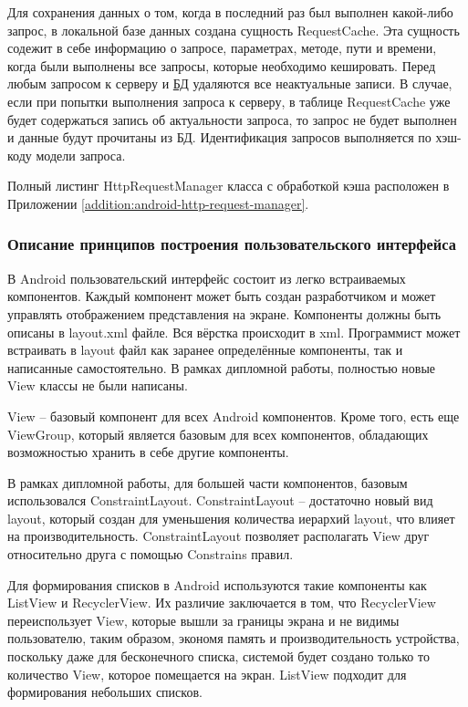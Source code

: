 Для сохранения данных о том, когда в последний раз был выполнен какой-либо запрос, в локальной базе данных создана сущность RequestCache.
Эта сущность содежит в себе информацию о запросе, параметрах, методе, пути и времени, когда были выполнены все запросы, которые необходимо кешировать.
Перед любым запросом к серверу и \hyperlink{gloss:db}{БД} удаляются все неактуальные записи.
В случае, если при попытки выполнения запроса к серверу, в таблице RequestCache уже будет содержаться запись об актуальности запроса, то запрос не будет выполнен и данные будут прочитаны из БД.
Идентификация запросов выполняется по хэш-коду модели запроса.

Полный листинг HttpRequestManager класса с обработкой кэша расположен в Приложении \ref{addition:android-http-request-manager}.

\subsubsection{Описание принципов построения пользовательского интерфейса}\indent

В Android пользовательский интерфейс состоит из легко встраиваемых компонентов.
Каждый компонент может быть создан разработчиком и может управлять отображением представления на экране.
Компоненты должны быть описаны в layout.xml файле.
Вся вёрстка происходит в xml.
Программист может встраивать в layout файл как заранее определённые компоненты, так и написанные самостоятельно.
В рамках дипломной работы, полностью новые View классы не были написаны.

View – базовый компонент для всех Android компонентов.
Кроме того, есть еще ViewGroup, который является базовым для всех компонентов, обладающих возможностью хранить в себе другие компоненты.

В рамках дипломной работы, для большей части компонентов, базовым использовался ConstraintLayout.
ConstraintLayout – достаточно новый вид layout, который создан для уменьшения количества иерархий layout, что влияет на производительность.
ConstraintLayout позволяет располагать View друг относительно друга с помощью Constrains правил.

Для формирования списков в Android используются такие компоненты как ListView и RecyclerView.
Их различие заключается в том, что RecyclerView переиспользует View, которые вышли за границы экрана и не видимы пользователю, таким образом, экономя память и производительность устройства, поскольку даже для бесконечного списка, системой будет создано только то количество View, которое помещается на экран.
ListView подходит для формирования небольших списков.

